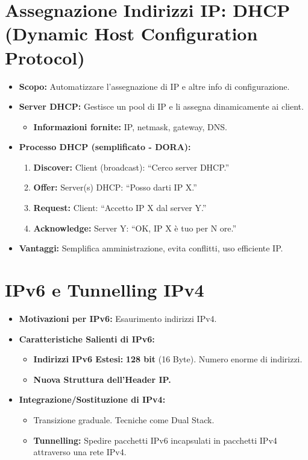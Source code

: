 \section{Assegnazione Indirizzi IP: DHCP (Dynamic Host Configuration Protocol)}
\begin{itemize}
    \item \textbf{Scopo:} Automatizzare l'assegnazione di IP e altre info di configurazione.
    \item \textbf{Server DHCP:} Gestisce un pool di IP e li assegna dinamicamente ai client.
    \begin{itemize}
        \item \textbf{Informazioni fornite:} IP, netmask, gateway, DNS.
    \end{itemize}
    \item \textbf{Processo DHCP (semplificato - DORA):}
    \begin{enumerate}
        \item \textbf{Discover:} Client (broadcast): ``Cerco server DHCP.''
        \item \textbf{Offer:} Server(s) DHCP: ``Posso darti IP X.''
        \item \textbf{Request:} Client: ``Accetto IP X dal server Y.''
        \item \textbf{Acknowledge:} Server Y: ``OK, IP X è tuo per N ore.''
    \end{enumerate}
    \item \textbf{Vantaggi:} Semplifica amministrazione, evita conflitti, uso efficiente IP.
\end{itemize}

\section{IPv6 e Tunnelling IPv4}
\begin{itemize}
    \item \textbf{Motivazioni per IPv6:} Esaurimento indirizzi IPv4.
    \item \textbf{Caratteristiche Salienti di IPv6:}
    \begin{itemize}
        \item \textbf{Indirizzi IPv6 Estesi:} \textbf{128 bit} (16 Byte). Numero enorme di indirizzi.
        \item \textbf{Nuova Struttura dell'Header IP.}
    \end{itemize}
    \item \textbf{Integrazione/Sostituzione di IPv4:}
    \begin{itemize}
        \item Transizione graduale. Tecniche come Dual Stack.
        \item \textbf{Tunnelling:} Spedire pacchetti IPv6 incapsulati in pacchetti IPv4 attraverso una rete IPv4.
    \end{itemize}
\end{itemize}

